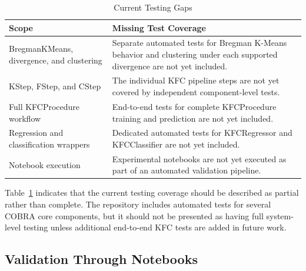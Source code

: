 \begin{table}[H]
      \centering
      \caption{Current Testing Gaps}
      \label{tab:current_testing_gaps}
      \renewcommand{\arraystretch}{1.2}
      \begin{tabularx}{\textwidth}{
                  >{\raggedright\arraybackslash}p{4.2cm}
                  >{\raggedright\arraybackslash}X
            }
            \toprule
            \textbf{Scope}                            & \textbf{Missing Test Coverage}                                                 \\
            \midrule
            BregmanKMeans, divergence, and clustering &
            Separate automated tests for Bregman K-Means behavior and clustering under each supported divergence are not yet included. \\
            KStep, FStep, and CStep                   &
            The individual KFC pipeline steps are not yet covered by independent component-level tests.                                  \\

            Full KFCProcedure workflow                &
            End-to-end tests for complete KFCProcedure training and prediction are not yet included.                                     \\

            Regression and classification wrappers    &
            Dedicated automated tests for KFCRegressor and KFCClassifier are not yet included.                                           \\

            Notebook execution                        &
            Experimental notebooks are not yet executed as part of an automated validation pipeline.                                     \\
            \bottomrule
      \end{tabularx}

\end{table}

Table~\ref{tab:current_testing_gaps} indicates that the current testing coverage should be described as partial rather than complete. The repository includes automated tests for several COBRA core components, but it should not be presented as having full system-level testing unless additional end-to-end KFC tests are added in future work.

\subsection{Validation Through Notebooks}

